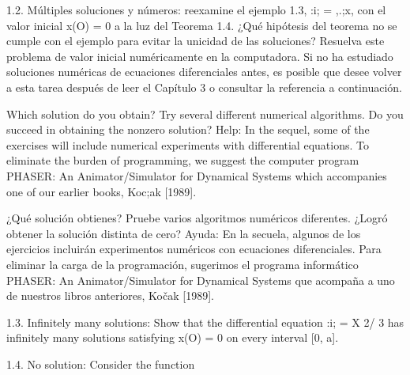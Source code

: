 \documentclass[]{article}
\begin{document}
1.2. Múltiples soluciones y números: reexamine el ejemplo 1.3, :i; = ,.;x, con el valor inicial x(O) = 0 a la luz del Teorema 1.4. ¿Qué hipótesis del teorema no se cumple con el ejemplo para evitar la unicidad de las soluciones? Resuelva este problema de valor inicial numéricamente en la computadora. Si no ha estudiado soluciones numéricas de ecuaciones diferenciales antes, es posible que desee volver a esta tarea después de leer el Capítulo 3 o consultar la referencia a continuación.

Which solution do you obtain? Try several different numerical algorithms. Do you succeed in obtaining the nonzero solution? Help: In the sequel, some of the exercises will include numerical experiments with differential equations. To eliminate the burden of programming, we suggest the computer program PHASER: An Animator/Simulator for Dynamical Systems which accompanies one of our earlier books, Koc;ak [1989].

¿Qué solución obtienes? Pruebe varios algoritmos numéricos diferentes. ¿Logró obtener la solución distinta de cero? Ayuda: En la secuela, algunos de los ejercicios incluirán experimentos numéricos con ecuaciones diferenciales. Para eliminar la carga de la programación, sugerimos el programa informático PHASER: An Animator/Simulator for Dynamical Systems que acompaña a uno de nuestros libros anteriores, Kočak [1989].

1.3. Infinitely many solutions: Show that the differential equation :i; = X 2/ 3 has infinitely many solutions satisfying x(O) = 0 on every interval [0, a].

1.4. No solution: Consider the function
\end{document}
